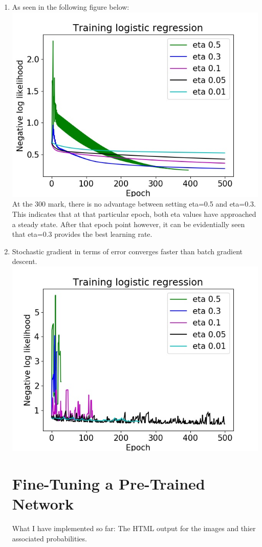 \documentclass[12pt,letterpaper]{article}
\begin{document}
\begin{enumerate}
	\item As seen in the following figure below:
	\includegraphics[width=\textwidth]{Eta}
	\centering 
	At the 300 mark, there is no advantage between setting eta=0.5 and eta=0.3. This indicates that at that particular epoch, both eta values have
	approached a steady state. After that epoch point however, it can be evidentially seen that eta=0.3 provides the best learning rate.

	\item Stochastic gradient in terms of error converges faster than batch gradient descent.
	\includegraphics[width=\textwidth]{SGD}
	
\section{Fine-Tuning a Pre-Trained Network}

What I have implemented so far: The HTML output for the images and thier associated
probabilities.


\end{enumerate}
\end{document}

